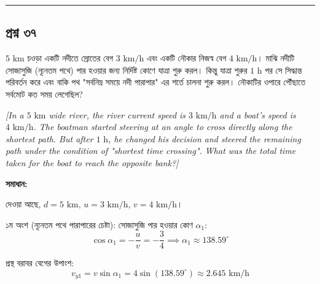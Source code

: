 \documentclass[11pt,a4paper]{article}
\begin{document}
\vspace{0.5cm}
\hrule
\vspace{0.5cm}

\subsection*{প্রশ্ন ৩৭}

$5\text{ km}$ চওড়া একটি নদীতে স্রোতের বেগ $3\text{ km/h}$ এবং একটি নৌকার নিজস্ব বেগ $4\text{ km/h}$। মাঝি নদীটি সোজাসুজি (ন্যূনতম পথে) পার হওয়ার জন্য নির্দিষ্ট কোণে যাত্রা শুরু করল। কিন্তু যাত্রা শুরুর $1\text{ h}$ পর সে সিদ্ধান্ত পরিবর্তন করে এবং বাকি পথ "সর্বনিম্ন সময়ে নদী পারাপার" এর শর্তে চালনা শুরু করল। নৌকাটির ওপারে পৌঁছাতে সর্বমোট কত সময় লেগেছিল?

\smallskip
\textit{[In a $5\text{ km}$ wide river, the river current speed is $3\text{ km/h}$ and a boat's speed is $4\text{ km/h}$. The boatman started steering at an angle to cross directly along the shortest path. But after $1\text{ h}$, he changed his decision and steered the remaining path under the condition of "shortest time crossing". What was the total time taken for the boat to reach the opposite bank?]}

\vspace{0.3cm}
\begin{center}
\end{center}

\textbf{সমাধান:}

দেওয়া আছে, $d = 5\text{ km}$, $u = 3\text{ km/h}$, $v = 4\text{ km/h}$।

১ম অংশ (ন্যূনতম পথে পারাপারের চেষ্টা):
সোজাসুজি পার হওয়ার কোণ $\alpha_1$:
$$\cos\alpha_1 = -\frac{u}{v} = -\frac{3}{4} \implies \alpha_1 \approx 138.59^\circ$$

প্রস্থ বরাবর বেগের উপাংশ:
$$v_{y1} = v\sin\alpha_1 = 4\sin(138.59^\circ) \approx 2.645\text{ km/h}$$
\end{document}
